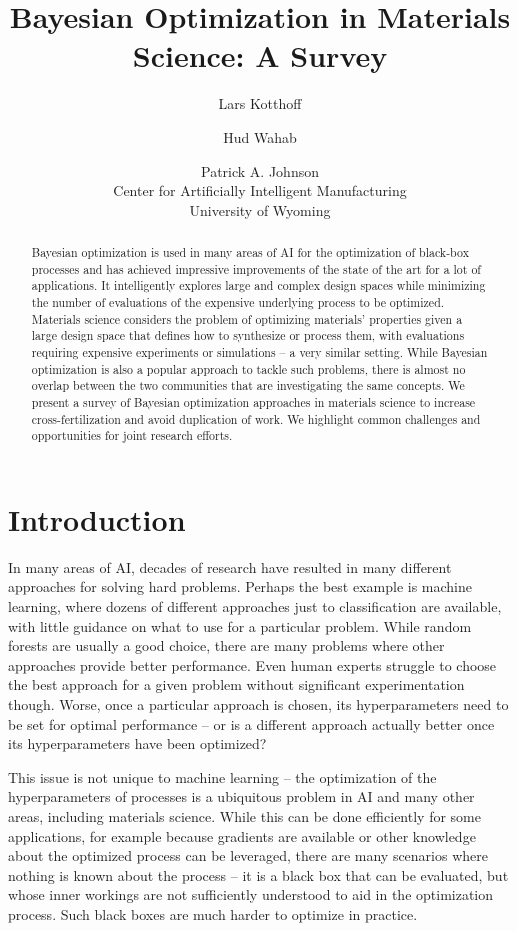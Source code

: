 \documentclass{article}
\title{Bayesian Optimization in Materials Science: A Survey}
\author{
Lars Kotthoff \and Hud Wahab \and Patrick A. Johnson\\
Center for Artificially Intelligent Manufacturing\\
University of Wyoming}
\begin{document}
\maketitle

\begin{abstract}
Bayesian optimization is used in many areas of AI for the optimization of black-box processes and has achieved impressive improvements of the state of the art for a lot of applications. It intelligently explores large and complex design spaces while minimizing the number of evaluations of the expensive underlying process to be optimized. Materials science considers the problem of optimizing materials' properties given a large design space that defines how to synthesize or process them, with evaluations requiring expensive experiments or simulations -- a very similar setting. While Bayesian optimization is also a popular approach to tackle such problems, there is almost no overlap between the two communities that are investigating the same concepts. We present a survey of Bayesian optimization approaches in materials science to increase cross-fertilization and avoid duplication of work. We highlight common challenges and opportunities for joint research efforts.
\end{abstract}

\section{Introduction}

In many areas of AI, decades of research have resulted in many different
approaches for solving hard problems. Perhaps the best example is machine
learning, where dozens of different approaches just to classification are
available, with little guidance on what to use for a particular problem. While
random forests are usually a good choice, there are many problems where other
approaches provide better performance. Even human experts struggle to choose the
best approach for a given problem without significant experimentation though.
Worse, once a particular approach is chosen, its hyperparameters need to be set
for optimal performance -- or is a different approach actually better once its
hyperparameters have been optimized?

This issue is not unique to machine learning -- the optimization of the
hyperparameters of processes is a ubiquitous problem in AI and many other areas,
including materials science. While this can be done efficiently for some
applications, for example because gradients are available or other knowledge
about the optimized process can be leveraged, there are many scenarios where
nothing is known about the process -- it is a black box that can be evaluated,
but whose inner workings are not sufficiently understood to aid in the
optimization process. Such black boxes are much harder to optimize in practice.
\end{document}
